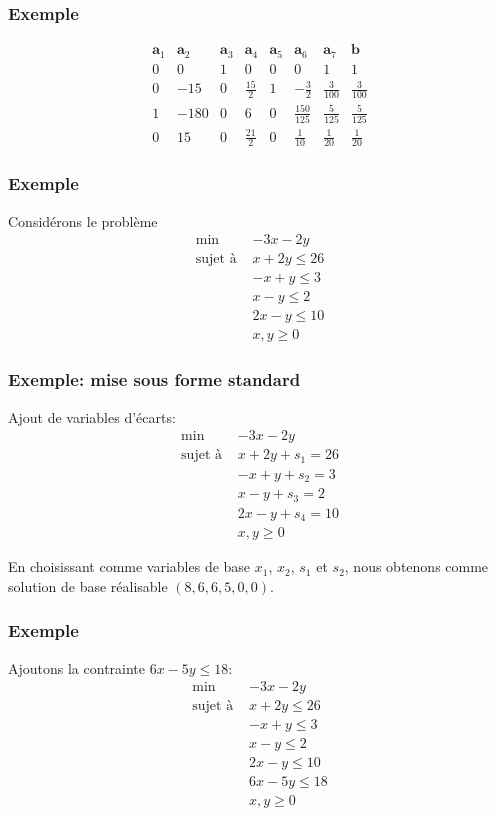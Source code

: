 \documentclass[t,usepdftitle=false]{beamer}
\def\ba{\boldsymbol{a}}
\def\bb{\boldsymbol{b}}
\begin{document}
\begin{frame}
\frametitle{Exemple}
	
	\[
	\begin{matrix}
		\ba_1 & \ba_2 & \ba_3 & \ba_4 & \ba_5 &\ba_6 &\ba_7 & \bb \\
		0 & 0 & 1 & 0 & 0 & 0 & 1 & 1 \\
		0 & -15 & 0 & \frac{15}{2} & 1 & -\frac{3}{2} & \frac{3}{100} & \frac{3}{100} \\
		1 & -180 & 0 & 6 & 0 & \frac{150}{125} & \frac{5}{125} & \frac{5}{125} \\
		0 & 15 & 0 & \frac{21}{2} & 0 & \frac{1}{10} & \frac{1}{20} & \frac{1}{20}
	\end{matrix}
	\]
	
\end{frame}

\begin{frame}
	\frametitle{Exemple}
	
	Considérons le problème
	\begin{align*}
		\min\ & -3x -2y \\
		\text{sujet à } & x + 2y \leq 26 \\
		& -x + y \leq 3 \\
		& x - y \leq 2 \\
		& 2x - y \leq 10 \\
		& x, y \geq 0
	\end{align*}
	
\end{frame}

\begin{frame}
	\frametitle{Exemple: mise sous forme standard}
	
	Ajout de variables d'écarts:
	\begin{align*}
		\min\ & -3x -2y \\
		\text{sujet à } & x + 2y + s_1 = 26 \\
		& -x + y + s_2 = 3 \\
		& x - y + s_3 = 2 \\
		& 2x - y + s_4 = 10 \\
		& x, y \geq 0
	\end{align*}
	
	En choisissant comme variables de base $x_1$, $x_2$, $s_1$ et $s_2$, nous obtenons comme solution de base réalisable $(8, 6, 6, 5, 0, 0)$.
	
\end{frame}

\begin{frame}
	\frametitle{Exemple}
	
	Ajoutons la contrainte $6x-5y \leq 18$:
	\begin{align*}
		\min\ & -3x -2y \\
		\text{sujet à } & x + 2y \leq 26 \\
		& -x + y \leq 3 \\
		& x - y \leq 2 \\
		& 2x - y \leq 10 \\
		& 6x-5y \leq 18 \\
		& x, y \geq 0
	\end{align*}
	
\end{frame}
\end{document}
